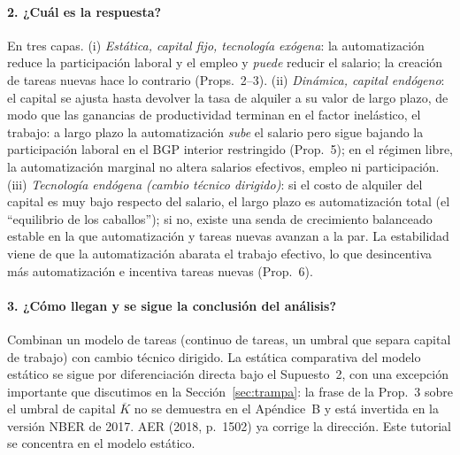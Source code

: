 \documentclass[11pt,a4paper]{article}
\theoremstyle{definition}
\theoremstyle{plain}
\theoremstyle{remark}
\numberwithin{equation}{section}
\newcommand{\Kb}{\overline K}
\begin{document}
\paragraph{2. ¿Cuál es la respuesta?}
En tres capas.
(i) \emph{Estática, capital fijo, tecnología exógena}: la automatización reduce la participación laboral y el
empleo y \emph{puede} reducir el salario; la creación de tareas nuevas hace lo contrario (Props.~2–3).
(ii) \emph{Dinámica, capital endógeno}: el capital se ajusta hasta devolver la tasa de alquiler a su valor de largo
plazo, de modo que las ganancias de productividad terminan en el factor inelástico, el trabajo: a largo plazo la
automatización \emph{sube} el salario pero sigue bajando la participación laboral en el BGP interior restringido (Prop.~5); en el régimen libre, la automatización marginal no altera salarios efectivos, empleo ni participación.
(iii) \emph{Tecnología endógena (cambio técnico dirigido)}: si el costo de alquiler del capital es muy bajo
respecto del salario, el largo plazo es automatización total (el ``equilibrio de los caballos''); si no, existe una
senda de crecimiento balanceado estable en la que automatización y tareas nuevas avanzan a la par. La estabilidad
viene de que la automatización abarata el trabajo efectivo, lo que desincentiva más automatización e incentiva
tareas nuevas (Prop.~6).

\paragraph{3. ¿Cómo llegan y se sigue la conclusión del análisis?}
Combinan un modelo de tareas (continuo de tareas, un umbral que separa capital de trabajo) con cambio técnico
dirigido. La estática comparativa del modelo estático se sigue por diferenciación directa bajo el Supuesto~2, con
una excepción importante que discutimos en la Sección~\ref{sec:trampa}: la frase de la Prop.~3 sobre el umbral de
capital $\Kb$ no se demuestra en el Apéndice~B y está invertida en la versión NBER de 2017. AER (2018, p.~1502) ya corrige la dirección. Este tutorial se concentra en el modelo estático.
\end{document}
